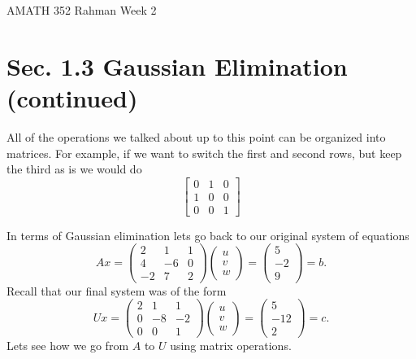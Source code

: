 \documentclass[reqno]{amsart}
\theoremstyle{definition}
\begin{document}
\begin{flushleft}
{\sc \Large AMATH 352 Rahman} \hfill Week 2
\bigskip
\end{flushleft}

\newcommand{\R}{\mathbb{R}}
\newcommand{\N}{\mathbb{N}}
\newcommand{\Z}{\mathbb{Z}}
\newcommand{\Q}{\mathbb{Q}}
\renewcommand{\CancelColor}{\color{red}}
\newcommand{\?}{\stackrel{?}{=}}
\renewcommand{\varphi}{\phi}
\newcommand{\card}{\text{Card}}
\newcommand{\bigzero}{\text{\Huge 0}}



\section*{Sec. 1.3 Gaussian Elimination (continued)}

All of the operations we talked about up to this point can be organized into matrices.
For example, if we want to switch the first and second rows, but keep the third as is
we would do
%
\begin{equation*}
\begin{bmatrix}
0 & 1 & 0\\
1 & 0 & 0\\
0 & 0 & 1
\end{bmatrix}
\end{equation*}
%

In terms of Gaussian elimination lets go back to our original system of equations
%
\begin{equation}
Ax = \begin{pmatrix}
2 & 1 & 1\\
4 & -6 & 0\\
-2 & 7 & 2
\end{pmatrix}\begin{pmatrix}
u\\
v\\
w
\end{pmatrix} = \begin{pmatrix}
5\\
-2\\
9
\end{pmatrix} = b.
\end{equation}
%
Recall that our final system was of the form
%
\begin{equation}
Ux = \begin{pmatrix}
2 & 1 & 1\\
0 & -8 & -2\\
0 & 0 & 1
\end{pmatrix}\begin{pmatrix}
u\\
v\\
w
\end{pmatrix} = \begin{pmatrix}
5\\
-12\\
2
\end{pmatrix} = c.
\end{equation}
%
Lets see how we go from $A$ to $U$ using matrix operations.
\end{document}
